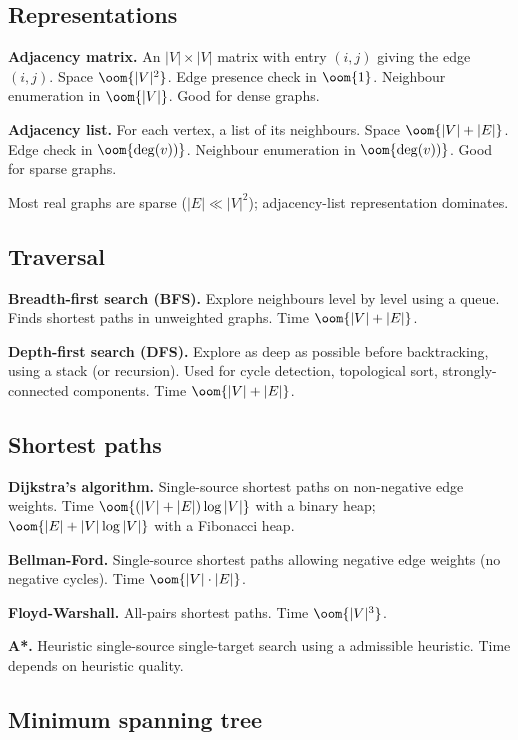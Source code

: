 \subsection{Representations}

\textbf{Adjacency matrix.} An $|V| \times |V|$ matrix with entry $(i, j)$ giving the edge $(i, j)$. Space $\oom{|V|^2}$. Edge presence check in $\oom{1}$. Neighbour enumeration in $\oom{|V|}$. Good for dense graphs.

\textbf{Adjacency list.} For each vertex, a list of its neighbours. Space $\oom{|V| + |E|}$. Edge check in $\oom{\deg(v))}$. Neighbour enumeration in $\oom{\deg(v))}$. Good for sparse graphs.

Most real graphs are sparse ($|E| \ll |V|^2$); adjacency-list representation dominates.

\subsection{Traversal}

\textbf{Breadth-first search (BFS).} Explore neighbours level by level using a queue. Finds shortest paths in unweighted graphs. Time $\oom{|V| + |E|}$.

\textbf{Depth-first search (DFS).} Explore as deep as possible before backtracking, using a stack (or recursion). Used for cycle detection, topological sort, strongly-connected components. Time $\oom{|V| + |E|}$.

\subsection{Shortest paths}

\textbf{Dijkstra's algorithm.} Single-source shortest paths on non-negative edge weights. Time $\oom{(|V| + |E|) \log |V|}$ with a binary heap; $\oom{|E| + |V| \log |V|}$ with a Fibonacci heap.

\textbf{Bellman-Ford.} Single-source shortest paths allowing negative edge weights (no negative cycles). Time $\oom{|V| \cdot |E|}$.

\textbf{Floyd-Warshall.} All-pairs shortest paths. Time $\oom{|V|^3}$.

\textbf{A*.} Heuristic single-source single-target search using a admissible heuristic. Time depends on heuristic quality.

\subsection{Minimum spanning tree}

